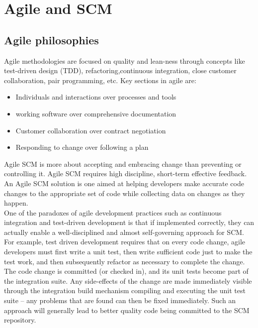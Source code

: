 \documentclass{article}
\begin{document}
\section{Agile and SCM}
\subsection{Agile philosophies}
Agile methodologies are focused on quality and lean-ness through concepts like test-driven design (TDD), refactoring,continuous integration, close customer collaboration, pair programming, etc. 
Key sections in agile are:
\begin{itemize}
\item Individuals and interactions over processes and tools
\item working software over comprehensive documentation
\item Customer collaboration over contract negotiation
\item Responding to change over following a plan
\end{itemize}
Agile SCM is more about accepting and embracing change than preventing or controlling it.
Agile SCM requires high discipline, short-term effective feedback. An Agile SCM solution is one aimed at helping developers make accurate code changes to the appropriate set of code while collecting data on changes as they happen. \\
One of the paradoxes of agile development practices such as continuous integration and test-driven development is that if implemented correctly, they can actually enable a well-disciplined and almost self-governing approach for SCM. For example, test driven development requires that on every code change, agile developers must first write a unit test, then write sufficient code just to make the test work, and then subsequently refactor as necessary to complete the change. The code change is committed (or checked in), and its unit tests become part of the integration suite. Any side-effects of the change are made immediately visible through the integration build mechanism compiling and executing the unit test suite -- any problems that are found can then be fixed immediately. Such an approach will generally lead to better quality code being committed to the SCM repository.
\end{document}
